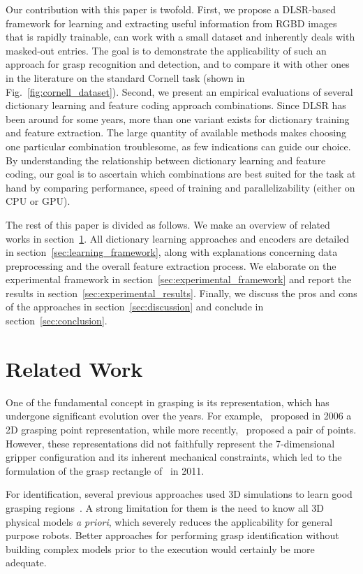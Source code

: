 \documentclass[svgnames]{scrartcl}
\begin{document}
Our contribution with this paper is twofold. First, we propose a DLSR-based framework for learning and extracting useful information from RGBD images that is rapidly trainable, can work with a small dataset and inherently deals with masked-out entries. The goal is to demonstrate the applicability of such an approach for grasp recognition and detection, and to compare it with other ones in the literature on the standard Cornell task (shown in Fig.~\ref{fig:cornell_dataset}). Second, we present an empirical evaluations of several dictionary learning and feature coding approach combinations. Since DLSR has been around for some years, more than one variant exists for dictionary training and feature extraction. The large quantity of available methods makes choosing one particular combination troublesome, as few indications can guide our choice. By understanding the relationship between dictionary learning and feature coding, our goal is to ascertain which combinations are best suited for the task at hand by comparing performance, speed of training and parallelizability (either on CPU or GPU).

The rest of this paper is divided as follows. We make an overview of related works in section~\ref{sec:related_work}. All dictionary learning approaches and encoders are detailed in section~\ref{sec:learning_framework}, along with explanations concerning data preprocessing and the overall feature extraction process. We elaborate on the experimental framework in section~\ref{sec:experimental_framework} and report the results in section~\ref{sec:experimental_results}. Finally, we discuss the pros and cons of the approaches in section~\ref{sec:discussion} and conclude in section~\ref{sec:conclusion}.

\section{Related Work}
\label{sec:related_work}
One of the fundamental concept in grasping is its representation, which has undergone significant evolution over the years. For example,~\citet{saxena2006robotic} proposed in 2006 a 2D grasping point representation, while more recently,~\citet{le2010learning} proposed a pair of points. However, these representations did not faithfully represent the 7-dimensional gripper configuration and its inherent mechanical constraints, which led to the formulation of the grasp rectangle of~\citet{jiang2011efficient} in 2011.

For identification, several previous approaches used 3D simulations to learn good grasping regions~\citep{goldfeder2007grasp, miller2004graspit, detry2013learning, pelossof2004svm}. A strong limitation for them is the need to know all 3D physical models \emph{a priori}, which severely reduces the applicability for general purpose robots. Better approaches for performing grasp identification without building complex models prior to the execution would certainly be more adequate. 
\end{document}
